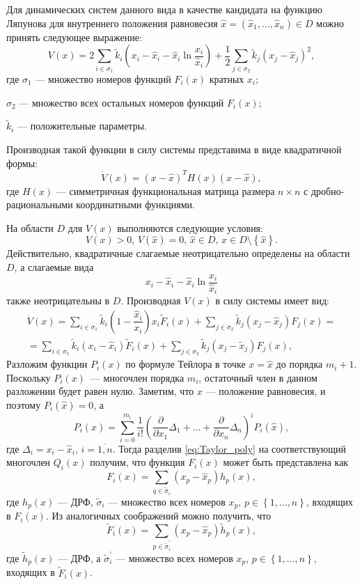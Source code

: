 \documentclass[14pt,a4paper]{extarticle}
\begin{document}
	Для динамических систем данного вида в качестве кандидата на функцию Ляпунова для внутреннего положения равновесия $\hat{x}=(\hat{x}_1,\ldots,\hat{x}_n)\in D$ можно принять следующее выражение:
	\[V(x)=2\sum\limits_{i\in\sigma_1}\tilde{k}_i\left(x_i-\hat{x}_i-\hat{x}_i\ln\dfrac{x_i}{\hat{x}_i}\right) + \dfrac{1}{2}\sum\limits_{j\in\sigma_2}\tilde{k}_j\left(x_j-\hat{x}_j\right)^2,\]
	где $\sigma_1$ --- множество номеров функций $F_i(x)$ кратных $x_i$;
	
	$\sigma_2$ --- множество всех остальных номеров функций $F_i(x)$;
	
	$\tilde{k}_i$ --- положительные параметры. 
	
	Производная такой функции в силу системы представима в виде квадратичной формы:
	\[\dot{V}(x)=(x-\hat{x})^{T}H(x)(x-\hat{x}),\]
	где $H(x)$ --- симметричная функциональная матрица размера $n\times n$ с дробно-рациональными координатными функциями. 
	
	На области $D$ для $V(x)$ выполняются следующие условия:
	\[V(x)>0,\, V(\hat{x})=0,\, \hat{x}\in D,\,x\in D\setminus\left\{\hat{x}\right\}.\]
	Действительно, квадратичные слагаемые неотрицательно определены на области $D$, а слагаемые вида
	\[x_i-\hat{x}_i-\hat{x}_i\ln\dfrac{x_i}{\hat{x}_i}\] 
	также неотрицательны в $D$. Производная $V(x)$ в силу системы имеет вид:
	\begin{multline*}
		\dot{V}(x)=\sum\limits_{i\in\sigma_1}\tilde{k}_i\left(1-\dfrac{\hat{x}_i}{x_i}\right)x_i\tilde{F}_i(x)+\sum\limits_{j\in\sigma_2}\tilde{k}_j(x_j-\hat{x}_j)F_j(x)=\\
		=\sum\limits_{i\in\sigma_1}\tilde{k}_i(x_i-\hat{x}_i)\tilde{F}_i(x)+\sum\limits_{j\in\sigma_2}\tilde{k}_j(x_j-\tilde{x}_j)F_j(x),
	\end{multline*}
	Разложим функции $P_i(x)$ по формуле Тейлора в точке $x=\hat{x}$ до порядка $m_i+1$. Поскольку $P_i(x)$~--- многочлен порядка $m_i$, остаточный член в данном разложении будет равен нулю. Заметим, что $\hat{x}$ --- положение равновесия, и поэтому $P_i(\hat{x})=0$, а
	\begin{equation}\label{eq:Taylor_poly}
		P_i(x) = \sum\limits_{i = 0}^{m_i}\dfrac{1}{i!}\left(\dfrac{\partial}{\partial{}x_1}\Delta_{1}+\ldots+\dfrac{\partial}{\partial{}x_n}\Delta_{n}\right)^{i}P_i(\hat{x}),
	\end{equation}
	где $\Delta_i=x_i-\hat{x}_i,\, i=\overline{1,n}$. Тогда разделив \ref{eq:Taylor_poly} на соответствующий многочлен $Q_i(x)$ получим, что функция $F_i(x)$ может быть представлена как
	\[F_i(x)=\sum\limits_{q\in\tilde{\sigma}_i}(x_p-\hat{x}_p)h_p(x),\]  
	где $h_p(x)$ --- ДРФ, $\tilde{\sigma}_i$ --- множество всех номеров $x_p,\, p\in\left\{1,\ldots,n\right\}$, входящих в $F_i(x)$. Из аналогичных соображений можно получить, что 
	\[
	\tilde{F}_i(x)=\sum\limits_{p\in\tilde{\sigma}^\prime_i}(x_p-\hat{x}_p)\tilde{h}_p(x),\]
	где $\tilde{h}_p(x)$ --- ДРФ, а $\tilde{\sigma}^\prime_i$ --- множество всех номеров $x_p,\, p\in\left\{1,\ldots,n\right\}$, входящих в $\tilde{F}_i(x)$.
	
\end{document}
